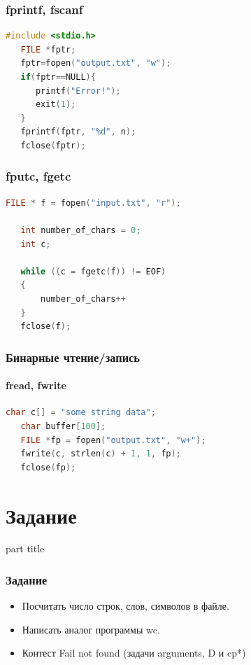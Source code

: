 \documentclass[14pt,pdf,hyperref={unicode}]{beamer}
\begin{document}
\begin{frame}[fragile]
\frametitle{fprintf, fscanf}  
\begin{lstlisting}[language=C++,basicstyle=\ttfamily,keywordstyle=\color{blue},
                stringstyle=\color{orange}\ttfamily]
   #include <stdio.h>
   FILE *fptr;
   fptr=fopen("output.txt", "w");
   if(fptr==NULL){
      printf("Error!");   
      exit(1);             
   }
   fprintf(fptr, "%d", n);   
   fclose(fptr);
\end{lstlisting}
\end{frame}


\begin{frame}[fragile]
\frametitle{fputc, fgetc}  
\begin{lstlisting}[language=C++,basicstyle=\ttfamily,keywordstyle=\color{blue},stringstyle=\color{orange}\ttfamily]
   FILE * f = fopen("input.txt", "r");
   
   int number_of_chars = 0;
   int c;
   
   while ((c = fgetc(f)) != EOF)
   {
       number_of_chars++
   }
   fclose(f);
\end{lstlisting}
\end{frame}

\begin{frame}[fragile]
\frametitle{Бинарные чтение/запись}  
\framesubtitle{fread, fwrite}  
\begin{lstlisting}[language=C++,basicstyle=\ttfamily,keywordstyle=\color{blue},stringstyle=\color{orange}\ttfamily]
   char c[] = "some string data";
   char buffer[100];
   FILE *fp = fopen("output.txt", "w+");
   fwrite(c, strlen(c) + 1, 1, fp);
   fclose(fp);
\end{lstlisting}
\end{frame}





\section{Задание}
\begin{frame}
\begin{center}
\begin{beamercolorbox}[sep=8pt,center]{part
title}
\insertsection
\end{beamercolorbox}
\end{center}
\end{frame}

\begin{frame}[fragile]
\frametitle{Задание} 
\begin{itemize}
\item Посчитать число строк, слов, символов в файле.
\item Написать аналог программы wc.
\item Контест Fail not found (задачи arguments, D и cp*)
\end{itemize}
\end{frame}
\end{document}
